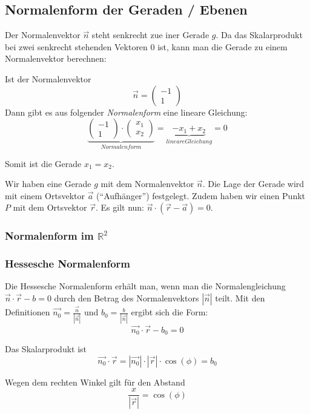 \subsection{Normalenform der Geraden / Ebenen}
Der Normalenvektor $\vec{n}$ steht senkrecht zue iner Gerade $g$. Da das
Skalarprodukt bei zwei senkrecht stehenden Vektoren $0$ ist, kann man
die Gerade zu einem Normalenvektor berechnen:

Ist der Normalenvektor
\[ \vec{n} = \left( \begin{array}{r} -1 \\ 1 \end{array} \right) \]
Dann gibt es aus folgender \emph{Normalenform} eine lineare
Gleichung:
\[ \underbrace{\left( \begin{array}{r} -1 \\ 1 \end{array} \right) \cdot
  \left( \begin{array}{r} x_1 \\ x_2 \end{array} \right)}_{Normalenform}
  = \underbrace{-x_1 + x_2}_{lineare Gleichung} = 0 \]

Somit ist die Gerade $x_1 = x_2$.

Wir haben eine Gerade $g$ mit dem Normalenvektor $\vec{n}$. Die Lage der Gerade
wird mit einem Ortsvektor $\vec{a}$ ("`Aufhänger"') festgelegt. Zudem
haben wir einen Punkt $P$ mit dem Ortsvektor $\vec{r}$. Es gilt nun: $\vec{n}
\cdot (\vec{r} - \vec{a}) = 0$.

\subsubsection{Normalenform im $\mathbb{R}^2$}

\subsubsection{Hessesche Normalenform}
Die Hessesche Normalenform erhält man, wenn man die Normalengleichung
$\vec{n} \cdot \vec{r} - b = 0$ durch den Betrag des Normalenvektors
$|\vec{n}|$ teilt. Mit den Definitionen $\vec{n_0} =
\frac{\vec{n}}{|\vec{n}|}$ und $b_0 = \frac{b}{|\vec{n}|}$ ergibt sich
die Form:
\[ \vec{n_0} \cdot \vec{r} - b_0 = 0 \]

Das Skalarprodukt ist
\[ \vec{n_0} \cdot \vec{r} = |\vec{n_0}| \cdot |\vec{r}| \cdot
\cos(\phi) = b_0 \]

Wegen dem rechten Winkel gilt für den Abstand
\[ \frac{x}{|\vec{r}|} = \cos(\phi)\]

